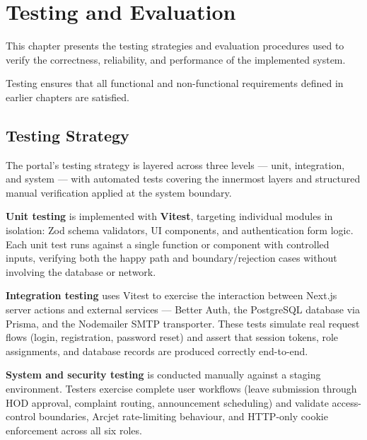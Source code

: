 
\chapter{Testing and Evaluation}

This chapter presents the testing strategies and evaluation
procedures used to verify the correctness, reliability, and
performance of the implemented system.

Testing ensures that all functional and non-functional
requirements defined in earlier chapters are satisfied.



\section{Testing Strategy}

The portal's testing strategy is layered across three levels — unit, integration, and system —
with automated tests covering the innermost layers and structured manual verification applied
at the system boundary.

\textbf{Unit testing} is implemented with \textbf{Vitest}, targeting individual modules in
isolation: Zod schema validators, UI components, and
authentication form logic. Each unit test runs against a single function or component with
controlled inputs, verifying both the happy path and boundary/rejection cases without
involving the database or network.

\textbf{Integration testing} uses Vitest to exercise the interaction between Next.js server
actions and external services — Better Auth, the PostgreSQL database via Prisma, and the
Nodemailer SMTP transporter. These tests simulate real request flows (login, registration,
password reset) and assert that session tokens, role assignments, and database records are
produced correctly end-to-end.

\textbf{System and security testing} is conducted manually against a staging environment.
Testers exercise complete user workflows (leave submission through HOD approval, complaint
routing, announcement scheduling) and validate access-control boundaries, Arcjet rate-limiting
behaviour, and HTTP-only cookie enforcement across all six roles.

